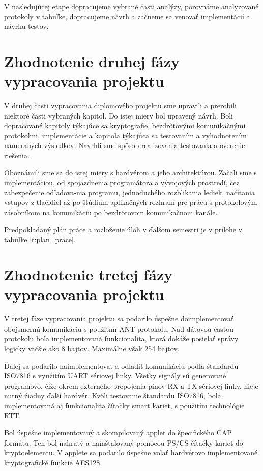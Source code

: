 \documentclass[12pt,a4paper,oneside,openright]{report}
\begin{document}
V nasledujúcej etape dopracujeme vybrané časti analýzy, porovnáme analyzované protokoly v tabuľke, dopracujeme návrh a začneme sa venovať implementácií a návrhu testov.

\section{Zhodnotenie druhej fázy vypracovania projektu}
V druhej časti vypracovania diplomového projektu sme upravili a prerobili niektoré časti vybraných kapitol. Do istej miery bol upravený návrh. Boli dopracované kapitoly týkajúce sa kryptografie, bezdrôtovými komunikačnými protokolmi, implementácie a kapitola týkajúca sa testovaním a vyhodnotením nameraných výsledkov. Navrhli sme spôsob realizovania testovania a overenie riešenia.

Oboznámili sme sa do istej miery s hardvérom a jeho architektúrou. Začali sme s implementáciou, od spojazdnenia programátora a vývojových prostredí, cez zabezpečenie odľadova-nia programu, jednoduchého rozblikania lediek, načítania vstupov z tlačidiel až po štúdium aplikačných rozhraní pre prácu s protokolovým zásobníkom na komunikáciu po bezdrôtovom komunikačnom kanále.

Predpokladaný plán práce a rozloženie úloh v ďalšom semestri je v prílohe v tabuľke \ref{t:plan_prace}.


\section{Zhodnotenie tretej fázy vypracovania projektu}
V tretej fáze vypracovania projektu sa podarilo úspešne doimplementovať obojsmernú komunikáciu s použitím ANT protokolu. Nad dátovou časťou protokolu bola implementovaná funkcionalita, ktorá dokáže posielať správy logicky väčšie ako 8 bajtov. Maximálne však 254 bajtov.

Ďalej sa podarilo naimplementovať a odladiť komunikáciu podľa štandardu ISO7816 s využitím UART sériovej linky. Všetky signály sú generované programovo, čiže okrem externého prepojenia pinov RX a TX sériovej linky, nieje nutný žiadny ďalší hardvér.
Kvôli testovanie štandardu ISO7816, bola implementovaná aj funkcionalita čítačky smart kariet, s použitím technológie RTT.

Bol úspešne implementovaný a skompilovaný applet do špecifického CAP formátu. Ten bol nahratý a nainštalovaný pomocou PS/CS čítačky kariet do kryptoelementu. V applete sa podarilo úspešne volať hardvérovo implementované kryptografické funkcie AES128.
\end{document}
